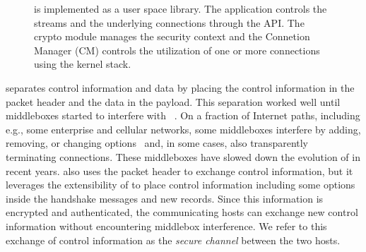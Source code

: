 \begin{figure}[!t]
\begin{center}
\end{center}
\vspace{-0.5cm}
\caption{\tcpls is implemented as a user space library. The application controls the streams and the underlying \tcp connections through the API. The crypto module manages the security context and the Connetion Manager (CM) controls the utilization of one or more \tcp connections using the kernel stack.}
\label{fig:arch}
\end{figure}

\tcp separates control information and data by placing the control information
in the packet header and the data in the payload. This separation worked well
until middleboxes started to interfere with \tcp~\cite{10.1145/1064413.1064418,
  honda2011still}. On a fraction of Internet paths, including e.g., some
enterprise and cellular networks, some middleboxes interfere by adding,
removing, or changing \tcp
options~\cite{wang2011untold,honda2011still,xu2015investigating} and, in some
cases, also transparently terminating \tcp connections. These middleboxes have
slowed down the evolution of \tcp in recent years. \tcpls also uses the packet
header to exchange \tcp control information, but it leverages the extensibility
of  to place control information including some \tcp options inside the
\tls handshake messages and new \tls records. Since this information is
encrypted and authenticated, the communicating hosts can exchange new control
information without encountering middlebox interference. We refer to this
exchange of control information as the \textit{secure channel} between the two hosts.

